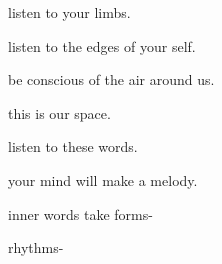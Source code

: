 \documentclass[extrafontsizes, 48pt]{memoir}
\newcommand\blankpage{%
    \null
    \thispagestyle{empty}%
    \addtocounter{page}{-1}%
    \newpage}
\begin{document}
	\begin{minipage}{.6\textwidth}
	listen to your limbs.
	\end{minipage}
	\newpage

	\begin{minipage}{.6\textwidth}
	listen to the edges of your self.
	\end{minipage}
	\newpage

	\begin{minipage}{.6\textwidth}
	be conscious of the air around us. 
	\end{minipage}
	\newpage

	\begin{minipage}{.6\textwidth}
	this is our space.
	\afterpage{\blankpage}
	\end{minipage}
	\newpage


	\begin{minipage}{.6\textwidth}
	listen to these words.
	\end{minipage}
	\newpage

	\begin{minipage}{.6\textwidth}
	your mind will make a melody.
	\afterpage{\blankpage}
	\end{minipage}
	\newpage

	\begin{minipage}{.6\textwidth}
	inner words take forms-
	\end{minipage}
	\newpage

	\begin{minipage}{.6\textwidth}
	rhythms-
	\end{minipage}
	\newpage
\end{document}
